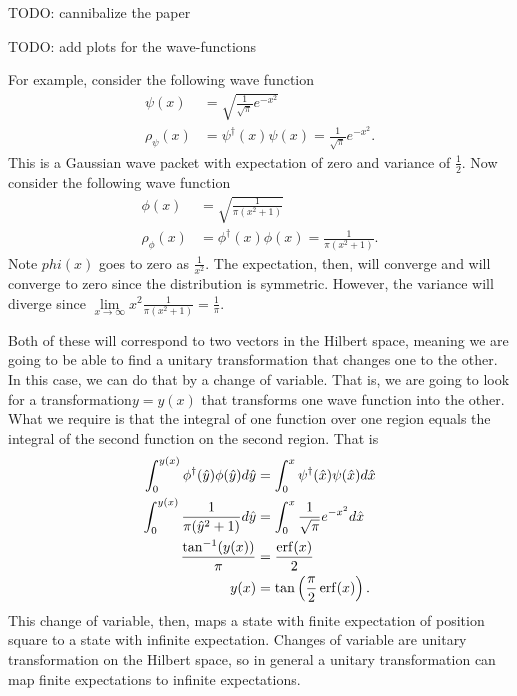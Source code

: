 TODO: cannibalize the paper

TODO: add plots for the wave-functions

For example, consider the following wave function
\begin{align}
	\psi(x) &= \sqrt{\frac{1}{\sqrt{\pi}}e^{-x^2}} \\
	\rho_{\psi}(x) &= \psi^\dagger(x) \psi(x) = \frac{1}{\sqrt{\pi}} e^{-x^2}.
\end{align}
This is a Gaussian wave packet with expectation of zero and variance of $\frac{1}{2}$. Now consider the following wave function
\begin{align}
	\phi(x) &= \sqrt{\frac{1}{\pi(x^2 + 1)}} \\
	\rho_{\phi}(x) &= \phi^\dagger(x) \phi(x) = \frac{1}{\pi(x^2 + 1)}.
\end{align}
Note $phi(x)$ goes to zero as $\frac{1}{x^2}$. The expectation, then, will converge and will converge to zero since the distribution is symmetric. However, the variance will diverge since $\lim\limits_{x\to \infty} x^2 \frac{1}{\pi(x^2 + 1)} = \frac{1}{\pi}$.

Both of these will correspond to two vectors in the Hilbert space, meaning we are going to be able to find a unitary transformation that changes one to the other. In this case, we can do that by a change of variable. That is, we are going to look for a transformation$y=y(x)$ that transforms one wave function into the other. What we require is that the integral of one function over one region equals the integral of the second function on the second region. That is
\begin{equation}
	\begin{aligned}
		\int_{0}^{y(x)} \phi^\dagger(\hat{y}) \phi(\hat{y}) d\hat{y} &= \int_{0}^{x} \psi^\dagger(\hat{x}) \psi(\hat{x}) d\hat{x} \\
		\int_{0}^{y(x)} \frac{1}{\pi(\hat{y}^2 + 1)} d\hat{y} &= \int_{0}^{x} \frac{1}{\sqrt{\pi}} e^{-x^2} d\hat{x} \\
		\frac{\tan^{-1}(y(x))}{\pi} &= \frac{\operatorname{erf}(x)}{2} \\
		y(x) &= \tan \left(\frac{\pi}{2}\operatorname{erf}(x)\right).
	\end{aligned}
\end{equation}
This change of variable, then, maps a state with finite expectation of position square to a state with infinite expectation. Changes of variable are unitary transformation on the Hilbert space, so in general a unitary transformation can map finite expectations to infinite expectations.


